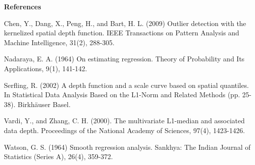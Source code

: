 \documentclass[11pt]{article}
\begin{document}
\begin{flushleft}
\vspace{0.2in}
\textbf{References}
\vspace{0.1in}

\small

Chen, Y., Dang, X., Peng, H., and Bart, H. L. (2009) Outlier detection with the kernelized spatial depth function. IEEE Transactions on Pattern Analysis and Machine Intelligence, 31(2), 288-305.
\vspace{0.05in}


Nadaraya, E. A. (1964) On estimating regression. Theory of Probability and Its Applications, 9(1), 141-142.
\vspace{0.05in}

Serfling, R. (2002) A depth function and a scale curve based on spatial quantiles. In Statistical Data Analysis Based on the L1-Norm and Related Methods (pp. 25-38). Birkhäuser Basel.
\vspace{0.05in}

Vardi, Y., and Zhang, C. H. (2000). The multivariate L1-median and associated data depth. Proceedings of the National Academy of Sciences, 97(4), 1423-1426.
\vspace{0.05in}

Watson, G. S. (1964) Smooth regression analysis. Sankhya: The Indian Journal of Statistics (Series A), 26(4), 359-372.

\end{flushleft}
\end{document}
